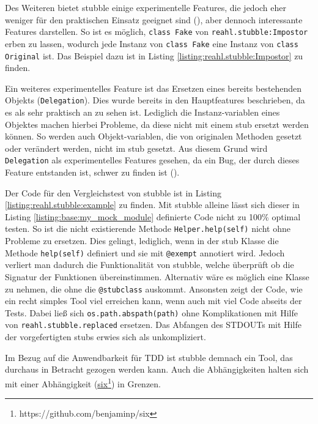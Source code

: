 Des Weiteren bietet stubble einige experimentelle Features, die jedoch eher
weniger für den praktischen Einsatz geeignet sind (\cite{reahl.stubble:4.0}),
aber dennoch interessante Features darstellen. So ist es möglich,
\lstinline{class Fake} von \lstinline{reahl.stubble:Impostor} erben zu lassen,
wodurch jede Instanz von \lstinline{class Fake} eine Instanz von
\lstinline{class Original} ist. Das Beispiel dazu ist in Listing
\ref{listing:reahl.stubble:Impostor} zu finden.

Ein weiteres experimentelles Feature ist das Ersetzen eines bereits bestehenden
Objekts (\lstinline{Delegation}). Dies wurde bereits in den Hauptfeatures
beschrieben, da es als sehr praktisch an zu sehen ist. Lediglich die
Instanz-variablen eines Objektes machen hierbei Probleme, da diese nicht mit
einem \Gls{stub} ersetzt werden können. So werden auch Objekt-variablen, die von
originalen Methoden gesetzt oder verändert werden, nicht im \Gls{stub} gesetzt.
Aus diesem Grund wird \lstinline{Delegation} als experimentelles Features
gesehen, da ein Bug, der durch dieses Feature entstanden ist, schwer zu finden
ist (\cite{reahl.stubble:4.0}).
\newline

Der Code für den Vergleichstest von stubble ist in Listing
\ref{listing:reahl.stubble:example} zu finden. Mit stubble alleine lässt sich
dieser in Listing \ref{listing:base:my_mock_module} definierte Code nicht zu
100\% optimal testen. So ist die nicht existierende Methode
\lstinline{Helper.help(self)} nicht ohne Probleme zu ersetzen. Dies gelingt,
lediglich, wenn in der \Gls{stub} Klasse die Methode \lstinline{help(self)}
definiert und sie mit \lstinline{@exempt} annotiert wird. Jedoch verliert man
dadurch die Funktionalität von stubble, welche überprüft ob die Signatur der
Funktionen übereinstimmen. Alternativ wäre es möglich eine Klasse zu nehmen,
die ohne die \lstinline{@stubclass} auskommt. Ansonsten zeigt der Code, wie ein
recht simples Tool viel erreichen kann, wenn auch mit viel Code abseits der
Tests. Dabei ließ sich \lstinline{os.path.abspath(path)} ohne Komplikationen
mit Hilfe von \lstinline{reahl.stubble.replaced} ersetzen. Das Abfangen des
STDOUTs mit Hilfe der vorgefertigten \Glspl{stub} erwies sich als unkompliziert.
\newline

Im Bezug auf die Anwendbarkeit für TDD ist stubble demnach ein Tool, das
durchaus in Betracht gezogen werden kann. Auch die Abhängigkeiten halten sich
mit einer Abhängigkeit
(\href{https://github.com/benjaminp/six}{six}\footnote{https://github.com/benjaminp/six})
in Grenzen.

